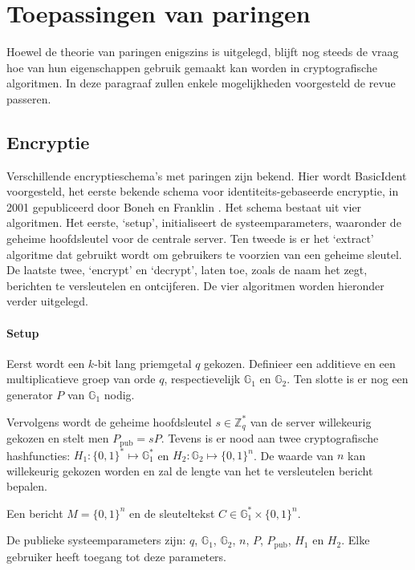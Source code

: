 \section{Toepassingen van paringen}

Hoewel de theorie van paringen enigszins is uitgelegd, blijft nog steeds de vraag hoe van hun eigenschappen gebruik gemaakt kan worden in cryptografische algoritmen. In deze paragraaf zullen enkele mogelijkheden voorgesteld de revue passeren.

\subsection{Encryptie}

Verschillende encryptieschema's met paringen zijn bekend. Hier wordt BasicIdent voorgesteld, het eerste bekende schema voor identiteits-gebaseerde encryptie, in 2001 gepubliceerd door Boneh en Franklin \cite{boneh}. Het schema bestaat uit vier algoritmen. Het eerste, `setup', initialiseert de systeemparameters, waaronder de geheime hoofdsleutel voor de centrale server. Ten tweede is er het `extract' algoritme dat gebruikt wordt om gebruikers te voorzien van een geheime sleutel. De laatste twee, `encrypt' en `decrypt', laten toe, zoals de naam het zegt, berichten te versleutelen en ontcijferen. De vier algoritmen worden hieronder verder uitgelegd.

\paragraph{Setup} Eerst wordt een $k$-bit lang priemgetal $q$ gekozen. Definieer een additieve en een multiplicatieve groep van orde $q$, respectievelijk $\mathbb{G}_1$ en  $\mathbb{G}_2$. Ten slotte is er nog een generator $P$ van $\mathbb{G}_1$ nodig.

Vervolgens wordt de geheime hoofdsleutel $s \in \mathbb{Z}^*_q$ van de server willekeurig gekozen en stelt men $P_{\text{pub}} = sP$. Tevens is er nood aan twee cryptografische hashfuncties: $H_1 : \{ 0,1 \}^* \mapsto \mathbb{G}_1^*$ en $H_2 : \mathbb{G}_2 \mapsto \{ 0, 1 \}^n$. De waarde van $n$ kan willekeurig gekozen worden en zal de lengte van het te versleutelen bericht bepalen.

Een bericht $M = \{ 0,1 \}^n$ en de sleuteltekst $C \in \mathbb{G}_1^* \times \{ 0,1 \}^n$.

De publieke systeemparameters zijn: $q$, $\mathbb{G}_1$, $\mathbb{G}_2$, $n$, $P$, $P_{\text{pub}}$, $H_1$ en $H_2$. Elke gebruiker heeft toegang tot deze parameters.


